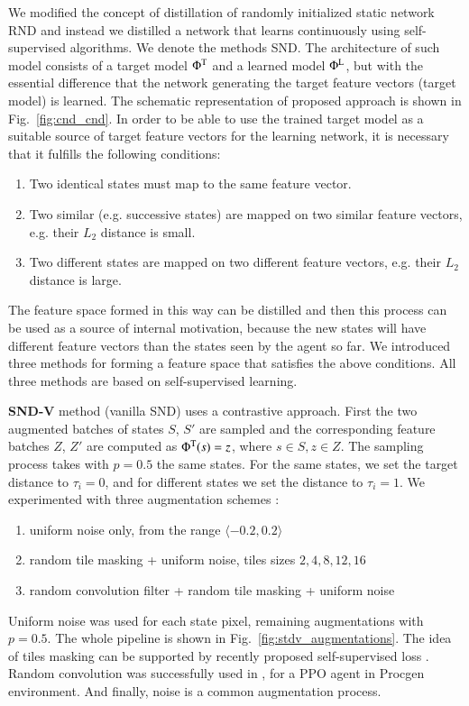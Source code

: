 \documentclass[a4paper,11pt]{elsarticle}
\begin{document}
We modified the concept of distillation of randomly initialized static network RND \citep{burda2018exploration} and instead we distilled a network that learns continuously using self-supervised algorithms. We denote the methods SND. The architecture of such model consists of a target model $\Phi^{\rm T}$ and a learned model $\Phi^{\rm L}$, but with the essential difference that the network generating the target feature vectors (target model) is learned. The schematic representation of proposed approach is shown in Fig.~\ref{fig:cnd_cnd}.
In order to be able to use the trained target model as a suitable source of target feature vectors for the learning network, it is necessary that it fulfills the following conditions:
\begin{enumerate}
\item Two identical states must map to the same feature vector.
\item Two similar (e.g. successive states) are mapped on two similar feature vectors, e.g. their $L_{2}$ distance is small.
\item Two different states are mapped on two different feature vectors, e.g. their $L_{2}$ distance is large.
\end{enumerate}

The feature space formed in this way can be distilled and then this process can be used as a source of internal motivation, because the new states will have different feature vectors than the states seen by the agent so far.
We introduced three methods for forming a feature space that satisfies the above conditions. All three methods are based on self-supervised learning.

\textbf{SND-V} method (vanilla SND) uses a contrastive approach.
First the two augmented batches of states $S$, $S'$ are sampled and the corresponding feature batches $Z$, $Z'$ are computed as $\Phi^{\rm T}(s) = z$, where $s \in S, z \in Z$.
The sampling process takes with $p=0.5$ the same states.
For the same states, we set the target distance to $\tau_i = 0$, and for different states we set the distance to $\tau_i =1$.
We experimented with three augmentation schemes : 
\begin{enumerate}
    \item uniform noise only, from the range $\langle -0.2, 0.2\rangle$
    \item random tile masking + uniform noise, tiles sizes $2, 4, 8, 12, 16$
    \item random convolution filter + random tile masking + uniform noise
\end{enumerate}
Uniform noise was used for each state pixel, remaining augmentations with $p=0.5$. The whole pipeline is shown in Fig.~\ref{fig:stdv_augmentations}. 
The idea of tiles masking can be supported by recently proposed self-supervised loss \citep{assran2022maskednetworks}. Random convolution was successfully used in \citep{lee2020randomization}, for a PPO agent in Procgen environment. And finally, noise is a common augmentation process.
\end{document}
